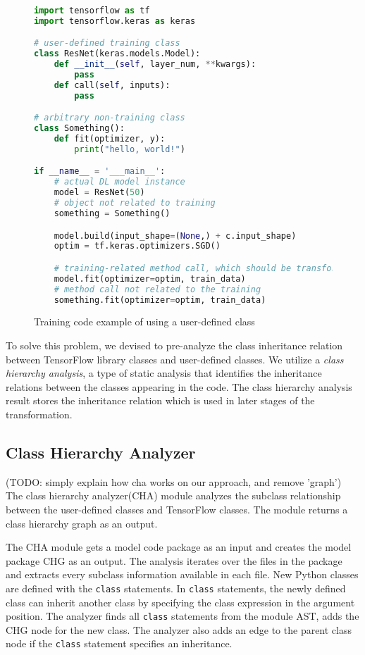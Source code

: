\begin{figure}[h]
  \begin{lstlisting}[language=Python]
import tensorflow as tf
import tensorflow.keras as keras

# user-defined training class
class ResNet(keras.models.Model): 
    def __init__(self, layer_num, **kwargs):
        pass
    def call(self, inputs):
        pass

# arbitrary non-training class 
class Something():
    def fit(optimizer, y):
        print("hello, world!") 

if __name__ = '___main__': 
    # actual DL model instance
    model = ResNet(50)
    # object not related to training
    something = Something()

    model.build(input_shape=(None,) + c.input_shape) 
    optim = tf.keras.optimizers.SGD()

    # training-related method call, which should be transformed
    model.fit(optimizer=optim, train_data) 
    # method call not related to the training  
    something.fit(optimizer=optim, train_data)
\end{lstlisting}
\caption{Training code example of using a user-defined class}
\label{fig:cha:ex}
\end{figure}

To solve this problem, we devised to pre-analyze the class inheritance
relation between TensorFlow library classes and user-defined classes. 
We utilize a \textit{class hierarchy analysis}, a type of static analysis
that identifies the inheritance relations between the classes appearing
in the code.
The class hierarchy analysis result stores the inheritance relation
which is used in later stages of the transformation.


\subsection{Class Hierarchy Analyzer} 

(TODO: simply explain how cha works on our approach, and remove 'graph')
The class hierarchy analyzer(CHA) module analyzes the
subclass relationship between the 
user-defined classes and TensorFlow classes.
The module returns a class hierarchy graph as an output.

The CHA module gets a model code package as an input
and creates the model package CHG as an output.
The analysis iterates over the files in the package
and extracts every subclass information available in each file.
New Python classes are defined with the {\tt class} statements.
In {\tt class} statements, the newly defined class can
inherit another class by specifying the class expression
in the argument position.
The analyzer finds all {\tt class} statements from the module AST,
adds the CHG node for the new class. The analyzer also adds an edge
to the parent class node if the {\tt class} statement specifies an inheritance.
